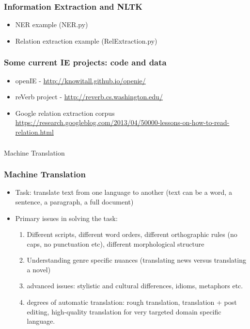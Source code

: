 \documentclass{beamer}
\begin{document}
\begin{frame}
\frametitle{Information Extraction and NLTK}
\begin{itemize}
\item NER example (NER.py)
\item Relation extraction example (RelExtraction.py)
\end{itemize}
\end{frame}

\begin{frame}
\frametitle{Some current IE projects: code and data}
\begin{itemize}
\item openIE - \url{http://knowitall.github.io/openie/}
\item reVerb project - \url{http://reverb.cs.washington.edu/}
\item Google relation extraction corpus \\  \url{https://research.googleblog.com/2013/04/50000-lessons-on-how-to-read-relation.html}
\end{itemize}
\end{frame}

\begin{frame}
\frametitle{}
\Large Machine Translation
\end{frame}


\begin{frame}
\frametitle{Machine Translation}
\begin{itemize}
\item Task: translate text from one language to another (text can be a word, a sentence, a paragraph, a full document)
\item Primary issues in solving the task:
\begin{enumerate}
\item Different scripts, different word orders, different orthographic rules (no caps, no punctuation etc), different morphological structure \pause
\item Understanding genre specific nuances (translating news versus translating a novel)
\item advanced issues: stylistic and cultural differences, idioms, metaphors etc. \pause
\item degrees of automatic translation: rough translation, translation + post editing, high-quality translation for very targeted domain specific language.
\end{enumerate}
\end{itemize}
\end{frame}
\end{document}
